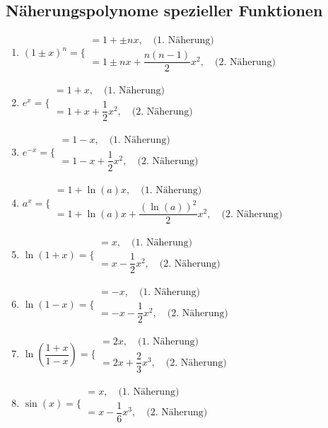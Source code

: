 \subsection{Näherungspolynome spezieller Funktionen}
\begin{enumerate}[$(a)$]
\item $\left(1\pm x\right)^n=\Bigg\{\begin{matrix}=1+\pm nx,\quad \text{(1. Näherung)}\\=1\pm nx+\dfrac{n\left(n-1\right)}{2}x^2,\quad \text{(2. Näherung)}\end{matrix}$
\item $e^x=\Bigg\{\begin{matrix}=1+x,\quad \text{(1. Näherung)}\\=1+x+\dfrac{1}{2}x^2,\quad \text{(2. Näherung)}\end{matrix}$
\item $e^{-x}=\Bigg\{\begin{matrix}=1-x,\quad \text{(1. Näherung)}\\=1-x+\dfrac{1}{2}x^2,\quad \text{(2. Näherung)}\end{matrix}$
\item $a^{x}=\Bigg\{\begin{matrix}=1+\ln\left(a\right)x,\quad \text{(1. Näherung)}\\=1+\ln\left(a\right)x+\dfrac{\left(\ln\left(a\right)\right)^2}{2}x^2,\quad \text{(2. Näherung)}\end{matrix}$
\item $\ln\left(1+x\right)=\Bigg\{\begin{matrix}=x,\quad \text{(1. Näherung)}\\=x-\dfrac{1}{2}x^2,\quad \text{(2. Näherung)}\end{matrix}$
\item $\ln\left(1-x\right)=\Bigg\{\begin{matrix}=-x,\quad \text{(1. Näherung)}\\=-x-\dfrac{1}{2}x^2,\quad \text{(2. Näherung)}\end{matrix}$
\item $\ln\left(\dfrac{1+x}{1-x}\right)=\Bigg\{\begin{matrix}=2x,\quad \text{(1. Näherung)}\\=2x+\dfrac{2}{3}x^3,\quad \text{(2. Näherung)}\end{matrix}$
\item $\sin\left(x\right)=\Bigg\{\begin{matrix}=x,\quad \text{(1. Näherung)}\\=x-\dfrac{1}{6}x^3,\quad \text{(2. Näherung)}\end{matrix}$

\end{enumerate}
